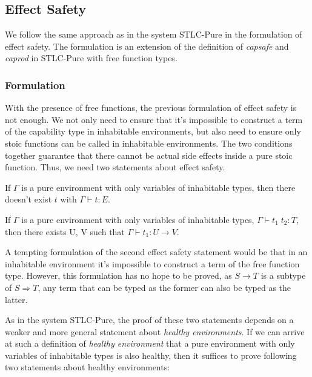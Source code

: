 \subsection{Effect Safety}

We follow the same approach as in the system STLC-Pure in the
formulation of effect safety. The formulation is an extension of the
definition of \emph{capsafe} and \emph{caprod} in STLC-Pure with free
function types.

\subsubsection{Formulation}

With the presence of free functions, the previous formulation of
effect safety is not enough. We not only need to ensure that it's
impossible to construct a term of the capability type in inhabitable
environments, but also need to ensure only stoic functions can be
called in inhabitable environments. The two conditions together
guarantee that there cannot be actual side effects inside a pure stoic
function. Thus, we need two statements about effect safety.

\begin{definition}
  If $\Gamma$ is a pure environment with only variables of inhabitable
  types, then there doesn't exist $t$ with $\Gamma \vdash t : E$.
\end{definition}

\begin{definition}
  If $\Gamma$ is a pure environment with only variables of inhabitable
  types, $\Gamma \vdash t_1 \; t_2 : T$, then there exists U, V such
  that $\Gamma \vdash t_1 : U \to V$.
\end{definition}

A tempting formulation of the second effect safety statement would be
that in an inhabitable environment it's impossible to construct a term
of the free function type. However, this formulation has no hope to be
proved, as $S \to T$ is a subtype of $S \Rightarrow T$, any term that
can be typed as the former can also be typed as the latter.

As in the system STLC-Pure, the proof of these two statements depends
on a weaker and more general statement about \emph{healthy
  environments}. If we can arrive at such a definition of
\emph{healthy environment} that a pure environment with only variables
of inhabitable types is also healthy, then it suffices to prove
following two statements about healthy environments:

